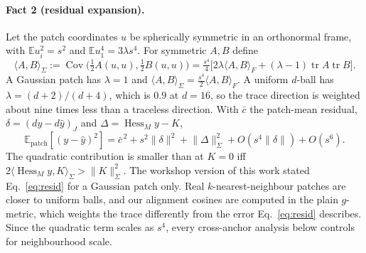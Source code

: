 \documentclass[10pt]{article}
\newcommand{\norm}[1]{\lVert #1 \rVert}
\newcommand{\Hess}{\operatorname{Hess}_M}
\begin{document}
\paragraph{Fact 2 (residual expansion).} Let the patch coordinates $u$ be spherically symmetric in an orthonormal frame, with $\mathbb{E}u_i^2=s^2$ and $\mathbb{E}u_1^4=3\lambda s^4$. For symmetric $A,B$ define
\begin{equation}
\langle A,B\rangle_\Sigma:=\operatorname{Cov}\!\big(\tfrac12A(u,u),\tfrac12B(u,u)\big)=\tfrac{s^4}{4}\big[2\lambda\langle A,B\rangle_F+(\lambda-1)\operatorname{tr}A\operatorname{tr}B\big].
\label{eq:sigma}
\end{equation}
A Gaussian patch has $\lambda=1$ and $\langle A,B\rangle_\Sigma=\tfrac{s^4}{2}\langle A,B\rangle_F$. A uniform $d$-ball has $\lambda=(d+2)/(d+4)$, which is $0.9$ at $d=16$, so the trace direction is weighted about nine times less than a traceless direction. With $\bar c$ the patch-mean residual, $\delta=(dy-d\hat y)_J$ and $\Delta=\Hess y-K$,
\begin{equation}
\mathbb{E}_{\mathrm{patch}}[(y-\hat y)^2]=\bar c^{\,2}+s^2\norm{\delta}^2+\norm{\Delta}_\Sigma^2+O(s^4\norm{\delta})+O(s^6).
\label{eq:resid}
\end{equation}
The quadratic contribution is smaller than at $K=0$ iff $2\langle\Hess y,K\rangle_\Sigma>\norm{K}_\Sigma^2$. The workshop version of this work stated Eq.~\eqref{eq:resid} for a Gaussian patch only. Real $k$-nearest-neighbour patches are closer to uniform balls, and our alignment cosines are computed in the plain $g$-metric, which weights the trace differently from the error Eq.~\eqref{eq:resid} describes. Since the quadratic term scales as $s^4$, every cross-anchor analysis below controls for neighbourhood scale.
\end{document}
